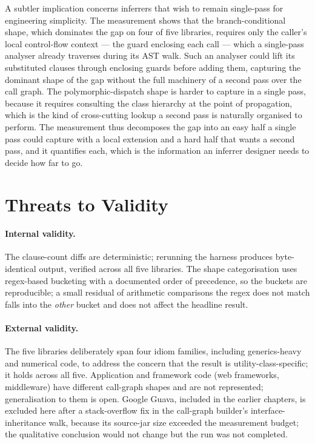A subtler implication concerns inferrers that wish to remain single-pass for
engineering simplicity. The measurement shows that the branch-conditional shape,
which dominates the gap on four of five libraries, requires only the caller's
local control-flow context --- the guard enclosing each call --- which a
single-pass analyser already traverses during its AST walk. Such an analyser could
lift its substituted clauses through enclosing guards before adding them,
capturing the dominant shape of the gap without the full machinery of a second
pass over the call graph. The polymorphic-dispatch shape is harder to capture in a
single pass, because it requires consulting the class hierarchy at the point of
propagation, which is the kind of cross-cutting lookup a second pass is naturally
organised to perform. The measurement thus decomposes the gap into an easy half a
single pass could capture with a local extension and a hard half that wants a
second pass, and it quantifies each, which is the information an inferrer designer
needs to decide how far to go.

\section{Threats to Validity}
\label{sec:comp-threats}

\paragraph{Internal validity.} The clause-count diffs are deterministic;
rerunning the harness produces byte-identical output, verified across all five
libraries. The shape categorisation uses regex-based bucketing with a documented
order of precedence, so the buckets are reproducible; a small residual of
arithmetic comparisons the regex does not match falls into the \emph{other}
bucket and does not affect the headline result.

\paragraph{External validity.} The five libraries deliberately span four idiom
families, including generics-heavy and numerical code, to address the concern
that the result is utility-class-specific; it holds across all five. Application
and framework code (web frameworks, middleware) have different call-graph shapes
and are not represented; generalisation to them is open. Google Guava, included
in the earlier chapters, is excluded here after a stack-overflow fix in the
call-graph builder's interface-inheritance walk, because its source-jar size
exceeded the measurement budget; the qualitative conclusion would not change but
the run was not completed.

